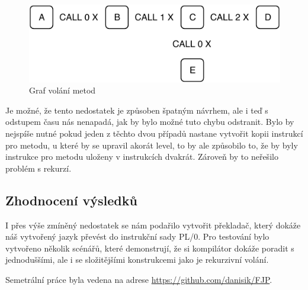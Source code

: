 \documentclass[12pt, a4paper]{article}
\begin{document}
\begin{figure}[!h]
  \centering
  \includegraphics[]{img/metody.pdf}
  \caption{Graf volání metod}
  \label{fig:metody}
\end{figure}

Je možné, že tento nedostatek je způsoben špatným návrhem, ale i teď s odstupem času nás nenapadá, jak by bylo možné tuto chybu odstranit. Bylo by nejspíše nutné pokud jeden z těchto dvou případů nastane vytvořit kopii instrukcí pro metodu, u které by se upravil akorát level, to by ale způsobilo to, že by byly instrukce pro metodu uloženy v instrukcích dvakrát. Zároveň by to neřešilo problém s rekurzí.

\subsection{Zhodnocení výsledků}
I přes výše zmíněný nedostatek se nám podařilo vytvořit překladač, který dokáže náš vytvořený jazyk převést do instrukční sady \textsf{PL/0}. Pro testování bylo vytvořeno několik scénářů, které demonstrují, že si kompilátor dokáže poradit s jednoduššími, ale i se složitějšími konstrukcemi jako je rekurzivní volání.

Semetrální práce byla vedena na adrese \href{https://github.com/danisik/FJP}{https://github.com/danisik/FJP}.
\end{document}
